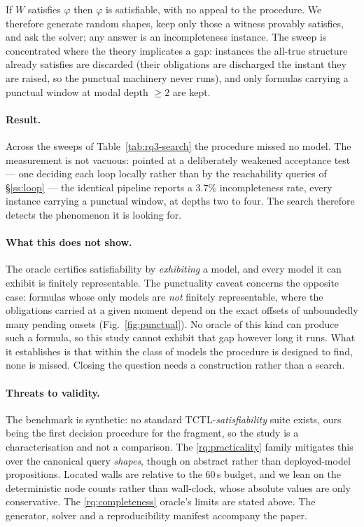 If $W$ satisfies $\varphi$ then $\varphi$ is satisfiable, with no appeal to the procedure. We
therefore generate random shapes, keep only those a witness provably satisfies, and ask the solver;
any \UNSAT{} answer is an incompleteness instance. The sweep is concentrated where the theory
implicates a gap: instances the all-true structure already satisfies are discarded (their
obligations are discharged the instant they are raised, so the punctual machinery never runs), and
only formulas carrying a punctual window at modal depth $\ge2$ are kept.



\paragraph{Result.}
Across the sweeps of Table~\ref{tab:rq3-search} the procedure missed no model. The measurement is
not vacuous: pointed at a deliberately weakened acceptance test --- one deciding each loop locally
rather than by the reachability queries of \S\ref{ss:loop} --- the identical pipeline reports a
$3.7\%$ incompleteness rate, every instance carrying a punctual window, at depths two to four. The
search therefore detects the phenomenon it is looking for.

\paragraph{What this does not show.}
The oracle certifies satisfiability by \emph{exhibiting} a model, and every model it can exhibit is
finitely representable. The punctuality caveat concerns the opposite case: formulas whose only
models are \emph{not} finitely representable, where the obligations carried at a given moment depend
on the exact offsets of unboundedly many pending onsets (Fig.~\ref{fig:punctual}). No oracle of this
kind can produce such a formula, so this study cannot exhibit that gap however long it runs.
What it establishes is that within the class of models the procedure is designed to find, none is
missed. Closing the question needs a construction rather than a search.

\paragraph{Threats to validity.}
The benchmark is synthetic: no standard TCTL-\emph{satisfiability} suite exists, ours being the first
decision procedure for the fragment, so the study is a characterisation and not a comparison. The
\ref{rq:practicality} family mitigates this over the canonical query \emph{shapes}, though on
abstract rather than deployed-model propositions. Located walls are relative to the $60$\,s budget,
and we lean on the deterministic node counts rather than wall-clock, whose absolute values are only
conservative. The \ref{rq:completeness} oracle's limits are stated above. The generator, solver and
a reproducibility manifest accompany the paper.

